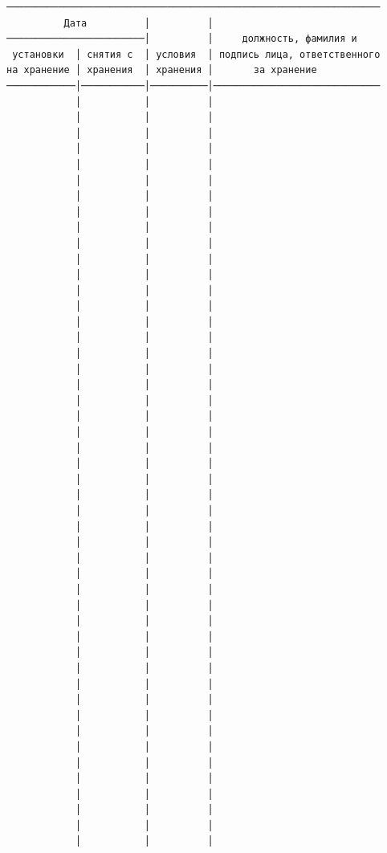 \documentclass[11pt,a4paper]{article}
\begin{document}
\begin{center}\small
\begin{BVerbatim}
─────────────────────────────────────────────────────────────────
          Дата          │          │
────────────────────────│          │     должность, фамилия и
 установки  │ снятия с  │ условия  │ подпись лица, ответственного
на хранение │ хранения  │ хранения │       за хранение
────────────│───────────│──────────│─────────────────────────────
            │           │          │
            │           │          │
            │           │          │
            │           │          │
            │           │          │
            │           │          │
            │           │          │
            │           │          │
            │           │          │
            │           │          │
            │           │          │
            │           │          │
            │           │          │
            │           │          │
            │           │          │
            │           │          │
            │           │          │
            │           │          │
            │           │          │
            │           │          │
            │           │          │
            │           │          │
            │           │          │
            │           │          │
            │           │          │
            │           │          │
            │           │          │
            │           │          │
            │           │          │
            │           │          │
            │           │          │
            │           │          │
            │           │          │
            │           │          │
            │           │          │
            │           │          │
            │           │          │
            │           │          │
            │           │          │
            │           │          │
            │           │          │
            │           │          │
            │           │          │
            │           │          │
            │           │          │
            │           │          │
            │           │          │
            │           │          │
\end{BVerbatim}
\end{center}
\end{document}
